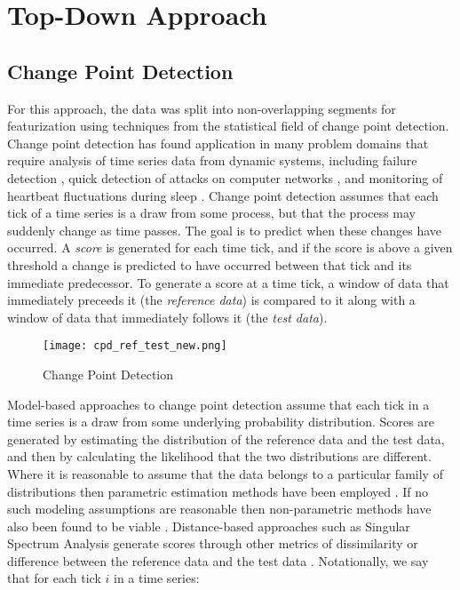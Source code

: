 \section{Top-Down Approach}
\label{sec:topdown}

\subsection{Change Point Detection}
For this approach, the data was split into non-overlapping segments for
featurization using techniques from the statistical field of change point detection.
Change point detection has found application in many problem domains that require analysis of time series data
from dynamic systems, including failure detection \cite{bae13}, quick detection of
attacks on computer networks \cite{tartakovsky06}, and monitoring of heartbeat fluctuations during
sleep \cite{staudacher05}. Change point detection assumes that each tick of a time series is a draw from some
process, but that the process may suddenly change as time passes.
The goal is to predict when these changes have occurred.
A \emph{score} is generated for each time tick, and if the score is
above a given threshold a change is predicted to have occurred between that tick
and its immediate predecessor. To generate a score at
a time tick, a window of data that immediately preceeds it (the
\emph{reference data}) is compared to it along with a window of data that immediately follows it
(the \emph{test data}).

\begin{figure}
 \centering
 \texttt{[image: cpd\_ref\_test\_new.png]}
 \caption{Change Point Detection}
 \label{fig:cpd_ref_test.png}
\end{figure}

Model-based approaches to change point detection assume that each tick in
a time series is a draw from some underlying probability distribution.
Scores are generated by estimating the distribution of the reference data
and the test data, and then by calculating the likelihood
that the two distributions are different.
Where it is reasonable to assume that the data belongs to a particular
family of distributions then parametric estimation methods have been employed
\cite{thatte11}. If no such modeling assumptions are reasonable then 
non-parametric methods have also been found to be viable \cite{matteson12}.
Distance-based approaches such as Singular Spectrum Analysis
generate scores through other metrics of 
dissimilarity or difference between the reference data and the test data
\cite{moskvina03}.
Notationally, we say that for each tick $i$ in a time series:

